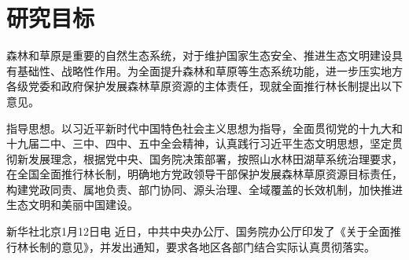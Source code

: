 \section{研究目标}

森林和草原是重要的自然生态系统，对于维护国家生态安全、推进生态文明建设具有基础性、战略性作用。为全面提升森林和草原等生态系统功能，进一步压实地方各级党委和政府保护发展森林草原资源的主体责任，现就全面推行林长制提出以下意见。

指导思想。以习近平新时代中国特色社会主义思想为指导，全面贯彻党的十九大和十九届二中、三中、四中、五中全会精神，认真践行习近平生态文明思想，坚定贯彻新发展理念，根据党中央、国务院决策部署，按照山水林田湖草系统治理要求，在全国全面推行林长制，明确地方党政领导干部保护发展森林草原资源目标责任，构建党政同责、属地负责、部门协同、源头治理、全域覆盖的长效机制，加快推进生态文明和美丽中国建设。

新华社北京1月12日电 近日，中共中央办公厅、国务院办公厅印发了《关于全面推行林长制的意见》，并发出通知，要求各地区各部门结合实际认真贯彻落实。